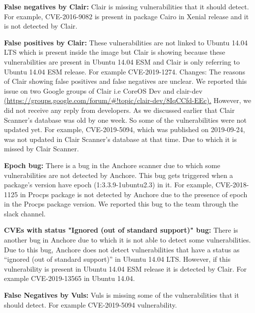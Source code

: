 \documentclass[a4paper,num-refs]{oup-contemporary}
\newcommand{\change}[2]{\color{cyan}Changes: #1\color{black}}
\begin{document}
\textbf{False negatives by Clair:} Clair is missing vulnerabilities that it should detect. For example, CVE-2016-9082 
is present in package Cairo in Xenial release and it is not detected by Clair.

\textbf{False positives by Clair:} These vulnerabilities are not linked to Ubuntu 14.04 LTS which is 
present inside the image but Clair is showing because these vulnerabilities are present in Ubuntu 14.04 ESM and 
Clair is only referring to Ubuntu 14.04 ESM release. For example CVE-2019-1274. \change{The reasons of Clair showing
false positives and false negatives are unclear. We reported this issue on two Google groups of Clair i.e CoreOS Dev and
clair-dev \href{https://groups.google.com/forum/\#!topic/clair-dev/8IqCCfd-EEc}{(https://groups.google.com/forum/\#!topic/clair-dev/8IqCCfd-EEc).}
However, we did not receive any reply from developers.}

\textbf{Database difference:} As we discussed earlier that Clair Scanner's database was old by one week.
                So some of the vulnerabilities were not updated yet. For example, CVE-2019-5094, which
		was published on 2019-09-24, was not 
		updated in Clair Scanner's database at that time. Due to which it is missed by Clair Scanner.


\textbf{Epoch bug:} There is a bug in the Anchore scanner due to which some vulnerabilities are 
		not detected by Anchore. This bug gets triggered when a package’s version have epoch 
		(1:3.3.9-1ubuntu2.3) in it. For example, CVE-2018-1125 in Procps package is not
		detected by Anchore due to the presence of epoch in the Procps package version.
		We reported this bug to the team through the slack channel.

\textbf{CVEs with status "Ignored (out of standard support)" bug:} There is another bug in Anchore due to 
		which it is not able to detect some vulnerabilities. Due to this bug, Anchore does not detect 
		vulnerabilities that have a status as “ignored (out of standard support)” in Ubuntu 14.04 LTS. 
		However, if this vulnerability is present in Ubuntu 14.04 ESM release it is detected by Clair. 
		For example CVE-2019-13565 in Ubuntu 14.04.


\textbf{False Negatives by Vuls:} Vuls is missing some of the vulnerabilities that it should detect. 
		For example CVE-2019-5094 vulnerability.
\end{document}
